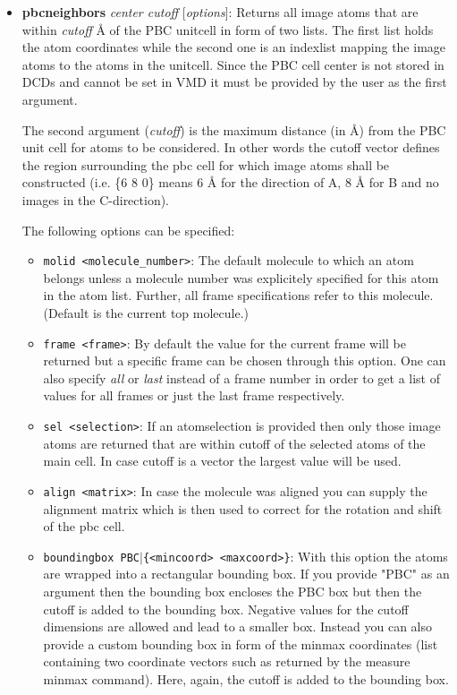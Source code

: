 \begin{itemize}
\item {\bf pbcneighbors} {\it center cutoff} [{\it options}]:
  Returns all image atoms that are within {\it cutoff} {\AA} of the PBC unitcell in form of two lists.
  The first list holds the atom coordinates while the second one is an indexlist mapping the image
  atoms to the atoms in the unitcell. Since the PBC cell center is not stored in DCDs and cannot 
  be set in VMD it must be provided by the user as the first argument.

  The second argument ({\it cutoff}) is the maximum distance (in {\AA}) from the PBC unit cell
  for atoms to be considered. In other words the cutoff vector defines the region surrounding the
  pbc cell for which image atoms shall be constructed (i.e. \{6 8 0\} means 6 {\AA} for the direction
  of A, 8 {\AA} for B and no images in the C-direction).

  The following options can be specified:
  \begin{itemize}
  \item {\tt molid <molecule\_number>}: The default molecule to which an atom belongs unless
    a molecule number was explicitely specified for this atom in the atom list. Further, all
    frame specifications refer to this molecule.
    (Default is the current top molecule.)
  \item {\tt frame <frame>}: 
    By default the value for the current frame will be
    returned but a specific frame can be chosen through this option. One can also
    specify {\it all} or {\it last} instead of a frame number in order to get a 
    list of values for all frames or just the last frame respectively.
  \item {\tt sel <selection>}: If an atomselection is provided then only those
    image atoms are returned that are within cutoff of the selected atoms
    of the main cell. In case cutoff is a vector the largest value will be
    used.
  \item {\tt align <matrix>}: In case the molecule was aligned you can supply the
    alignment matrix which is then used to correct for the rotation and shift of the pbc cell.
  \item {\tt boundingbox PBC$\mid$\{<mincoord> <maxcoord>\}}: With this option the atoms are
    wrapped into a rectangular bounding box. If you provide "PBC" as an argument then the
    bounding box encloses the PBC box but then the cutoff is added to the bounding box.
    Negative values for the cutoff dimensions are allowed and lead to a smaller box.
    Instead you can also provide a custom bounding box in form of the minmax coordinates
    (list containing two coordinate vectors such as returned by the measure minmax command).
    Here, again, the cutoff is added to the bounding box.
  \end{itemize}


\end{itemize}
